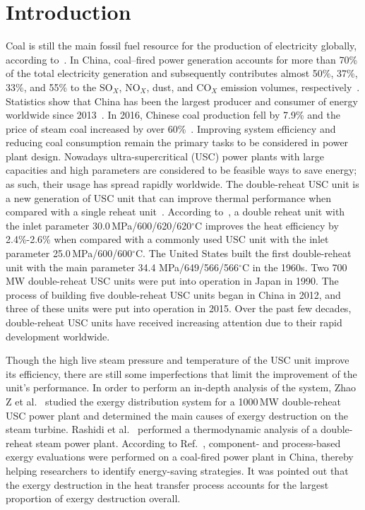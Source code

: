 \documentclass[preprint,12pt]{elsarticle}
\begin{document}
\begin{multicols}{2}
\printnomenclature[1.5cm]{}
\end{multicols}



\section{Introduction}
\label{sec1:intro}
Coal is still the main fossil fuel resource for the production of electricity globally, according to~\cite{Ouedraogo2013Energy}. 
In China, coal–fired power generation accounts for more than 70\% of the total electricity generation and subsequently contributes almost 50\%, 37\%, 33\%, and 55\% to the SO$_X$, NO$_X$, dust, and CO$_X$ emission volumes, respectively~\cite{Zhang2010Analysis}.
Statistics show that China has been the largest producer and consumer of energy worldwide since 2013~\cite{Petroleum2014BP}. 
In 2016, Chinese coal production fell by 7.9\% and the price of steam coal increased by over 60\%~\cite{Petroleum2017BP}. 
Improving system efficiency and reducing coal consumption remain the primary tasks to be considered in power plant design. Nowadays ultra-supercritical (USC) power plants with large capacities and high parameters are considered to be feasible ways to save energy; as such, their usage has spread rapidly worldwide.
The double-reheat USC unit is a new generation of USC unit that can improve thermal performance when compared with a single reheat unit~\cite{Zhao2017Exergy}. 
According to~\cite{Zhao2017Exergy}, a double reheat unit with the inlet parameter 30.0\,MPa/600/620/620$^\circ$C improves the heat efficiency by 2.4\%-2.6\% when compared with a commonly used USC unit with the inlet parameter 25.0\,MPa/600/600$^\circ$C.
 The United States built the first double-reheat unit with the main parameter 34.4 MPa/649/566/566$^\circ$C in the 1960s.
 Two 700 MW double-reheat USC units were put into operation in Japan in 1990. 
 The process of building five double-reheat USC units began in China in 2012, and three of these units were put into operation in 2015.
 Over the past few decades, double-reheat USC units have received increasing attention due to their rapid development worldwide.

  

Though the high live steam pressure and temperature of the USC unit improve its efficiency, there are still some imperfections that limit the improvement of the unit's performance. 
In order to perform an in-depth analysis of the system, Zhao Z et al.~\cite{Zhao2017Exergy} studied the exergy distribution system for a 1000\,MW double-reheat USC power plant and determined the main causes of exergy destruction on the steam turbine.
Rashidi et al.~\cite{Rashidi2014Thermodynamic} performed a thermodynamic analysis of a double-reheat steam power plant.
According to Ref.~\cite{Wu2014Component}, component- and process-based exergy evaluations were performed on a coal-fired power plant in China, thereby helping researchers to identify energy-saving strategies.
It was pointed out that the exergy destruction in the heat transfer process accounts for the largest proportion of exergy destruction overall.
\end{document}
